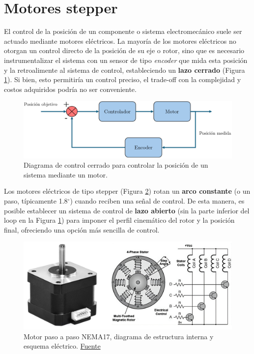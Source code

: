 \section{Motores stepper}

El control de la posición de un componente o sistema electromecánico suele ser actuado mediante motores eléctricos. La mayoría de los motores eléctricos no otorgan un control directo de la posición de su eje o rotor, sino que es necesario instrumentalizar el sistema con un sensor de tipo \textit{encoder} que mida esta posición y la retroalimente al sistema de control, estableciendo un \textbf{lazo cerrado} (Figura \ref{controlup}). Si bien, esto permitiría un control preciso, el trade-off con la complejidad y costos adquiridos podría no ser conveniente.

\begin{figure}[h!]
    \centering
    \includegraphics[width=1.0\linewidth]{imgs/controlup.png}
    \caption{Diagrama de control cerrado para controlar la posición de un sistema mediante un motor.}
    \label{controlup}
\end{figure}

Los motores eléctricos de tipo stepper (Figura \ref{stpi}) rotan un \textbf{arco constante} (o un paso, típicamente 1.8$^\circ$) cuando reciben una señal de control. De esta manera, es posible establecer un sistema de control de \textbf{lazo abierto} (sin la parte inferior del loop en la Figura \ref{controlup}) para imponer el perfil cinemático del rotor y la posición final, ofreciendo una opción más sencilla de control. 

\begin{figure}[h!]
    \centering
    \includegraphics[width=0.8\linewidth]{imgs/stps.png}
    \caption{Motor paso a paso NEMA17, diagrama de estructura interna y esquema eléctrico. \href{https://www.techniker-forum.de/thema/schrittmotor-unipolar-bipolar-parallel-seriell-geschaltet.111747/}{Fuente}}
    \label{stpi}
\end{figure}

